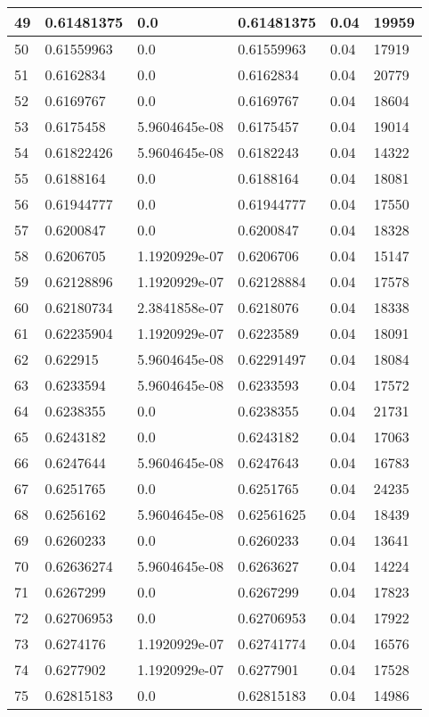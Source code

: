 \begin{longtable}{|l|l|l|l|l|l|}
49 & 0.61481375 & 0.0 & 0.61481375 & 0.04 & 19959 \\ \hline 
50 & 0.61559963 & 0.0 & 0.61559963 & 0.04 & 17919 \\ \hline 
51 & 0.6162834 & 0.0 & 0.6162834 & 0.04 & 20779 \\ \hline 
52 & 0.6169767 & 0.0 & 0.6169767 & 0.04 & 18604 \\ \hline 
53 & 0.6175458 & 5.9604645e-08 & 0.6175457 & 0.04 & 19014 \\ \hline 
54 & 0.61822426 & 5.9604645e-08 & 0.6182243 & 0.04 & 14322 \\ \hline 
55 & 0.6188164 & 0.0 & 0.6188164 & 0.04 & 18081 \\ \hline 
56 & 0.61944777 & 0.0 & 0.61944777 & 0.04 & 17550 \\ \hline 
57 & 0.6200847 & 0.0 & 0.6200847 & 0.04 & 18328 \\ \hline 
58 & 0.6206705 & 1.1920929e-07 & 0.6206706 & 0.04 & 15147 \\ \hline 
59 & 0.62128896 & 1.1920929e-07 & 0.62128884 & 0.04 & 17578 \\ \hline 
60 & 0.62180734 & 2.3841858e-07 & 0.6218076 & 0.04 & 18338 \\ \hline 
61 & 0.62235904 & 1.1920929e-07 & 0.6223589 & 0.04 & 18091 \\ \hline 
62 & 0.622915 & 5.9604645e-08 & 0.62291497 & 0.04 & 18084 \\ \hline 
63 & 0.6233594 & 5.9604645e-08 & 0.6233593 & 0.04 & 17572 \\ \hline 
64 & 0.6238355 & 0.0 & 0.6238355 & 0.04 & 21731 \\ \hline 
65 & 0.6243182 & 0.0 & 0.6243182 & 0.04 & 17063 \\ \hline 
66 & 0.6247644 & 5.9604645e-08 & 0.6247643 & 0.04 & 16783 \\ \hline 
67 & 0.6251765 & 0.0 & 0.6251765 & 0.04 & 24235 \\ \hline 
68 & 0.6256162 & 5.9604645e-08 & 0.62561625 & 0.04 & 18439 \\ \hline 
69 & 0.6260233 & 0.0 & 0.6260233 & 0.04 & 13641 \\ \hline 
70 & 0.62636274 & 5.9604645e-08 & 0.6263627 & 0.04 & 14224 \\ \hline 
71 & 0.6267299 & 0.0 & 0.6267299 & 0.04 & 17823 \\ \hline 
72 & 0.62706953 & 0.0 & 0.62706953 & 0.04 & 17922 \\ \hline 
73 & 0.6274176 & 1.1920929e-07 & 0.62741774 & 0.04 & 16576 \\ \hline 
74 & 0.6277902 & 1.1920929e-07 & 0.6277901 & 0.04 & 17528 \\ \hline 
75 & 0.62815183 & 0.0 & 0.62815183 & 0.04 & 14986 \\ \hline 
\end{longtable}